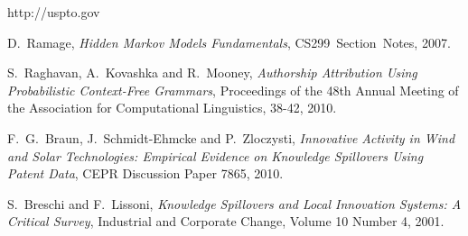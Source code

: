\documentclass[conference]{IEEEtran}
\begin{document}
\begin{thebibliography}{1}


http://uspto.gov

D.~Ramage, \emph{Hidden Markov Models Fundamentals}, CS299~Section~Notes, 2007.

S.~Raghavan, A.~Kovashka and R.~Mooney, \emph{Authorship Attribution Using Probabilistic Context-Free Grammars}, Proceedings of the 48th Annual Meeting of the Association for Computational Linguistics, 38-42, 2010.

F.~G.~Braun, J.~Schmidt-Ehmcke and P.~Zloczysti, \emph{Innovative Activity in Wind and Solar Technologies: Empirical Evidence on Knowledge Spillovers Using Patent Data}, CEPR Discussion Paper 7865, 2010.

S.~Breschi and F.~Lissoni, \emph{Knowledge Spillovers and Local Innovation Systems: A Critical Survey}, Industrial and Corporate Change, Volume 10 Number 4, 2001.

\end{thebibliography}




\end{document}
